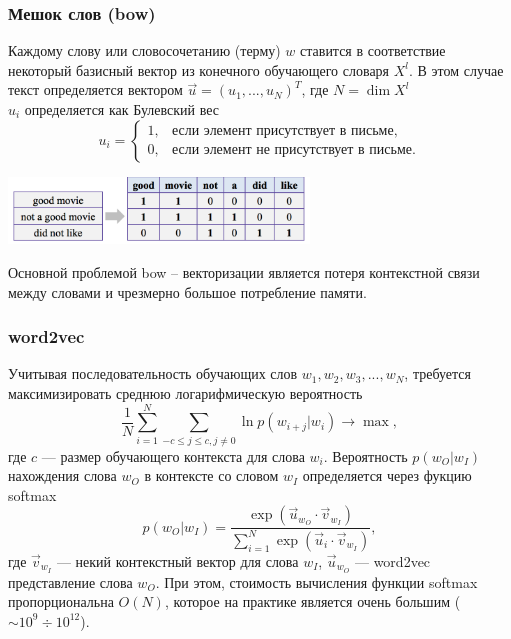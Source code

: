 \documentclass[compress,professionalfont]{beamer}
\begin{document}
\begin{frame}
\frametitle{Мешок слов (bow)}

Каждому слову или словосочетанию (терму) $w$ ставится в соответствие некоторый базисный вектор из конечного обучающего словаря  $X^l$. В этом случае текст определяется вектором $\vec{u} = (u_1, ..., u_N)^T$,
где $N = \dim X^l$ \\
$u_i$ определяется как Булевский вес
$$
u_i = \begin{cases}
1, & \mbox{если элемент присутствует в письме}, \\
0, & \mbox{если элемент не присутствует в письме}.
\end{cases}
$$

\begin{center}
\includegraphics[width=0.6\textwidth]{bow.png}
\end{center}

Основной проблемой bow -- векторизации является потеря контекстной связи между словами и чрезмерно большое потребление памяти.

\end{frame}

\begin{frame}
\frametitle{word2vec}

Учитывая последовательность обучающих слов $w_1, w_2, w_3, ..., w_N$, требуется максимизировать среднюю логарифмическую вероятность
$$
\dfrac{1}{N}\sum_{i=1}^{N}\sum_{-c \leqslant j \leqslant c, j \neq 0} \ln p(w_{i+j}|w_i) \rightarrow \max,
$$
где $c$ --- размер обучающего контекста для слова $w_i$. Вероятность $p(w_O|w_I)$ нахождения слова $w_O$ в контексте со словом $w_I$ определяется через фукцию softmax
$$
p(w_O|w_I) = \dfrac{\exp({\vec{u}_{w_O}\cdot\vec{v}_{w_I}})}{\sum_{i=1}^{N} \exp({\vec{u}_{i} \cdot \vec{v}_{w_I}})},
$$
где $\vec{v}_{w_I}$ --- некий контекстный вектор для слова $w_I$, $\vec{u}_{w_O}$ --- word2vec представление слова $w_O$.
При этом, стоимость вычисления функции softmax пропорциональна $O(N)$, которое на практике является очень большим ($\sim10^9\div10^{12}$).


\end{frame}
\end{document}
